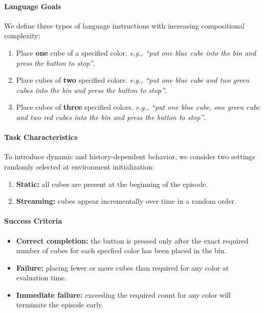 \paragraph{Language Goals}
We define three types of language instructions with increasing compositional complexity:
\begin{enumerate}[itemsep=1pt, topsep=0pt, leftmargin=*]
    \item Place \textbf{one} cube of a specified color.  
    \textit{e.g., ``put one blue cube into the bin and press the button to stop''}.
    
    \item Place cubes of \textbf{two} specified colors.
    \textit{e.g., ``put one blue cube and two green cubes into the bin and press the button to stop''}.
    
    \item Place cubes of \textbf{three} specified colors.
    \textit{e.g., ``put one blue cube, one green cube and two red cubes into the bin and press the button to stop''}.
\end{enumerate}

\paragraph{Task Characteristics}
To introduce dynamic and history-dependent behavior, we consider two settings randomly selected at environment initialization:
\begin{enumerate}[itemsep=1pt, topsep=0pt, leftmargin=*]
    \item \textbf{Static:} all cubes are present at the beginning of the episode.
    \item \textbf{Streaming:} cubes appear incrementally over time in a random order.
\end{enumerate}

\paragraph{Success Criteria}
\begin{itemize}[itemsep=1pt, topsep=0pt, leftmargin=*]
    \item \textbf{Correct completion:} the button is pressed only after the exact required number of cubes for each specfied color has been placed in the bin.
    \item \textbf{Failure:} placing fewer or more cubes than required for any color at evaluation time.
    \item \textbf{Immediate failure:} exceeding the required count for any color will terminate the episode early.
\end{itemize}



